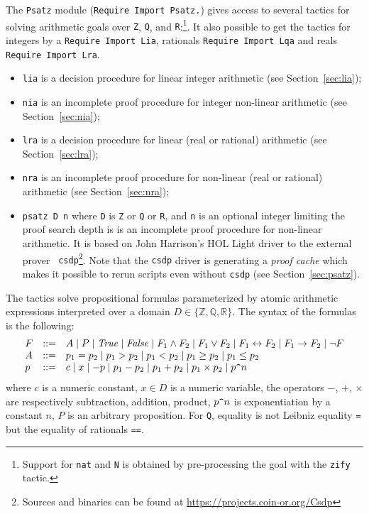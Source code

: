 \newtheorem{theorem}{Theorem}


      
\label{sec:psatz-hurry}
The {\tt Psatz} module ({\tt Require Import Psatz.}) gives access to
several tactics for solving arithmetic goals over {\tt Z}, {\tt Q}, and
{\tt R}:\footnote{Support for {\tt nat} and {\tt N} is obtained by
  pre-processing the goal with the {\tt zify} tactic.}.
It also possible to get the tactics for integers by a {\tt Require Import Lia}, rationals {\tt Require Import Lqa}
and reals {\tt Require Import Lra}.
\begin{itemize}
\item {\tt lia} is a decision procedure for linear integer arithmetic (see Section~\ref{sec:lia});
\item {\tt nia} is an incomplete proof procedure for integer non-linear arithmetic (see Section~\ref{sec:nia});
\item {\tt lra} is a decision procedure for linear (real or rational) arithmetic  (see Section~\ref{sec:lra});
\item {\tt nra} is an incomplete proof procedure for non-linear (real or rational) arithmetic  (see Section~\ref{sec:nra});
\item {\tt psatz D n} where {\tt D} is {\tt Z} or {\tt Q} or {\tt R}, and
  {\tt n} is an optional integer limiting the proof search depth is is an
  incomplete proof procedure for non-linear arithmetic. It is based on
  John Harrison's HOL Light driver to the external prover {\tt
    csdp}\footnote{Sources and binaries can be found at
    \url{https://projects.coin-or.org/Csdp}}. Note that the {\tt csdp}
  driver is generating a \emph{proof cache} which makes it possible to
  rerun scripts even without {\tt csdp} (see Section~\ref{sec:psatz}).
\end{itemize}

The tactics solve propositional formulas parameterized by atomic arithmetic expressions
interpreted over a domain $D \in \{\mathbb{Z}, \mathbb{Q}, \mathbb{R} \}$.
The syntax of the formulas is the following:
\[
\begin{array}{lcl}
 F &::=&  A \mid P \mid \mathit{True} \mid \mathit{False} \mid F_1 \land F_2 \mid F_1 \lor F_2 \mid F_1 \leftrightarrow F_2 \mid F_1 \to F_2 \mid \neg F\\
 A &::=& p_1 = p_2 \mid  p_1 > p_2 \mid p_1 < p_2 \mid p_1 \ge p_2 \mid p_1 \le p_2 \\
 p &::=& c \mid x \mid {-}p \mid p_1 - p_2 \mid p_1 + p_2 \mid p_1 \times p_2 \mid p \verb!^! n
\end{array}
\]
where $c$ is a numeric constant, $x\in D$ is a numeric variable, the
operators $-$, $+$, $\times$ are respectively subtraction, addition,
product, $p \verb!^!n $ is exponentiation by a constant $n$, $P$ is an
arbitrary proposition.
 For {\tt Q}, equality is not Leibniz equality {\tt =} but the equality of rationals {\tt ==}.

